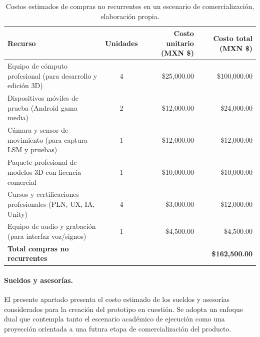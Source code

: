 \begin{table}[H]
	\centering
	\renewcommand{\arraystretch}{1.6}
	\setlength{\tabcolsep}{10pt}
	\Huge
	\begin{adjustbox}{max width=\textwidth}
		\begin{tabular}{|p{7cm}|c|r|r|}
			\hline
			\textbf{Recurso} & \textbf{Unidades} & \textbf{Costo unitario (MXN \$)} & \textbf{Costo total (MXN \$)} \\ \hline
			Equipo de cómputo profesional (para desarrollo y edición 3D) & 4 & \$25,000.00 & \$100,000.00 \\ \hline
			Dispositivos móviles de prueba (Android gama media) & 2 & \$12,000.00 & \$24,000.00 \\ \hline
			Cámara y sensor de movimiento (para captura LSM y pruebas) & 1 & \$12,000.00 & \$12,000.00 \\ \hline
			Paquete profesional de modelos 3D con licencia comercial & 1 & \$10,000.00 & \$10,000.00 \\ \hline
			Cursos y certificaciones profesionales (PLN, UX, IA, Unity) & 4 & \$3,000.00 & \$12,000.00 \\ \hline
			Equipo de audio y grabación (para interfaz voz/signos) & 1 & \$4,500.00 & \$4,500.00 \\ \hline
			\textbf{Total compras no recurrentes} & & & \textbf{\$162,500.00} \\ \hline
		\end{tabular}
	\end{adjustbox}
	\caption[Costos estimados de compras no recurrentes en un escenario de comercialización]{Costos estimados de compras no recurrentes en un escenario de comercialización, elaboración propia.}
	\label{tab:compras_no_recurrentes_comercial}
\end{table}


\paragraph{\textbf{Sueldos y asesorías.}} 
El presente apartado presenta el costo estimado de los sueldos y asesorías considerados para la creación del prototipo en cuestión. Se adopta un enfoque dual que contempla tanto el escenario académico de ejecución como una proyección orientada a una futura etapa de comercialización del producto.

